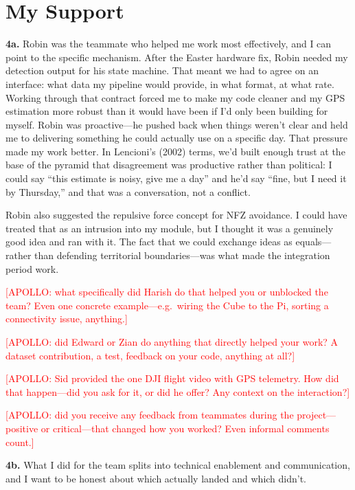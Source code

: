 \section{My Support}

\textbf{4a.}
Robin was the teammate who helped me work most effectively, and I can point to the specific mechanism. After the Easter hardware fix, Robin needed my detection output for his state machine. That meant we had to agree on an interface: what data my pipeline would provide, in what format, at what rate. Working through that contract forced me to make my code cleaner and my GPS estimation more robust than it would have been if I'd only been building for myself. Robin was proactive---he pushed back when things weren't clear and held me to delivering something he could actually use on a specific day. That pressure made my work better. In Lencioni's (2002) terms, we'd built enough trust at the base of the pyramid that disagreement was productive rather than political: I could say ``this estimate is noisy, give me a day'' and he'd say ``fine, but I need it by Thursday,'' and that was a conversation, not a conflict.

Robin also suggested the repulsive force concept for NFZ avoidance. I could have treated that as an intrusion into my module, but I thought it was a genuinely good idea and ran with it. The fact that we could exchange ideas as equals---rather than defending territorial boundaries---was what made the integration period work.

\textcolor{red}{[APOLLO: what specifically did Harish do that helped you or unblocked the team? Even one concrete example---e.g.\ wiring the Cube to the Pi, sorting a connectivity issue, anything.]}

\textcolor{red}{[APOLLO: did Edward or Zian do anything that directly helped your work? A dataset contribution, a test, feedback on your code, anything at all?]}

\textcolor{red}{[APOLLO: Sid provided the one DJI flight video with GPS telemetry. How did that happen---did you ask for it, or did he offer? Any context on the interaction?]}

\textcolor{red}{[APOLLO: did you receive any feedback from teammates during the project---positive or critical---that changed how you worked? Even informal comments count.]}

\textbf{4b.}
What I did for the team splits into technical enablement and communication, and I want to be honest about which actually landed and which didn't.

